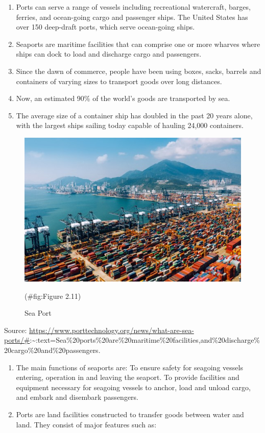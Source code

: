 \documentclass[
]{book}
\begin{document}
\begin{enumerate}
\def\labelenumi{\arabic{enumi})}
\item
  Ports can serve a range of vessels including recreational watercraft, barges, ferries, and ocean-going cargo and passenger ships. The United States has over 150 deep-draft ports, which serve ocean-going ships.
\item
  Seaports are maritime facilities that can comprise one or more wharves where ships can dock to load and discharge cargo and passengers.
\item
  Since the dawn of commerce, people have been using boxes, sacks, barrels and containers of varying sizes to transport goods over long distances.
\item
  Now, an estimated 90\% of the world's goods are transported by sea.
\item
  The average size of a container ship has doubled in the past 20 years alone, with the largest ships sailing today capable of hauling 24,000 containers.
\end{enumerate}

\begin{figure}

{\centering \includegraphics{./Images/Intro/Sea Port} 

}

\caption{Sea Port}(\#fig:Figure 2.11)
\end{figure}

Source: \url{https://www.porttechnology.org/news/what-are-sea-ports/\#}:\textasciitilde:text=Sea\%20ports\%20are\%20maritime\%20facilities,and\%20discharge\%20cargo\%20and\%20passengers.

\begin{enumerate}
\def\labelenumi{\arabic{enumi})}
\setcounter{enumi}{5}
\item
  The main functions of seaports are: To ensure safety for seagoing vessels entering, operation in and leaving the seaport. To provide facilities and equipment necessary for seagoing vessels to anchor, load and unload cargo, and embark and disembark passengers.
\item
  Ports are land facilities constructed to transfer goods between water and land. They consist of major features such as:
\end{enumerate}
\end{document}

